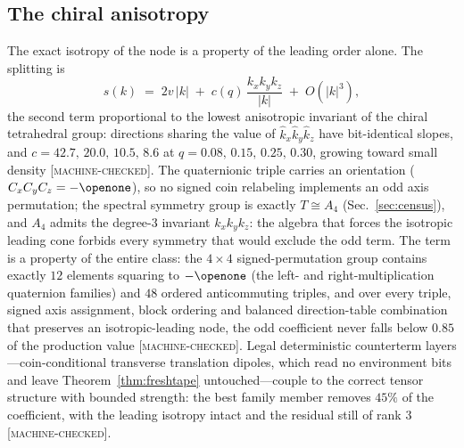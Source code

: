 \documentclass[aps,prd,twocolumn,superscriptaddress,nofootinbib,floatfix]{revtex4-2}
\newcommand{\evM}{\textnormal{\textsc{[machine-checked]}}}
\begin{document}
\subsection{The chiral anisotropy}
\label{sec:chiralaniso}

The exact isotropy of the node is a property of the leading order
alone. The splitting is
\begin{equation}
s(k)\;=\;2v\,|k|\;+\;c(q)\,\frac{k_xk_yk_z}{|k|}\;+\;O(|k|^3),
\label{eq:oddterm}
\end{equation}
the second term proportional to the lowest anisotropic invariant of
the chiral tetrahedral group: directions sharing the value of
$\hat k_x\hat k_y\hat k_z$ have bit-identical slopes, and
$c=42.7,\,20.0,\,10.5,\,8.6$ at $q=0.08,\,0.15,\,0.25,\,0.30$, growing
toward small density \evM{}. The quaternionic triple carries an
orientation ($C_xC_yC_z=-\openone$), so no signed coin relabeling
implements an odd axis permutation; the spectral symmetry group is
exactly $T\cong A_4$ (Sec.~\ref{sec:census}), and $A_4$ admits the
degree-3 invariant $k_xk_yk_z$: the algebra that forces the isotropic
leading cone forbids every symmetry that would exclude the odd term.
The term is a property of the entire class: the $4\times4$
signed-permutation group contains exactly $12$ elements squaring to
$-\openone$ (the left- and right-multiplication quaternion families)
and $48$ ordered anticommuting triples, and over every triple,
signed axis assignment, block ordering and balanced direction-table
combination that preserves an isotropic-leading node, the odd
coefficient never falls below $0.85$ of the production value \evM{}.
Legal deterministic counterterm layers---coin-conditional
transverse translation dipoles, which read no environment bits and
leave Theorem~\ref{thm:freshtape} untouched---couple to the
correct tensor structure with bounded strength: the best family
member removes $45\%$ of the coefficient, with the leading isotropy
intact and the residual still of rank 3 \evM{}.
\end{document}
